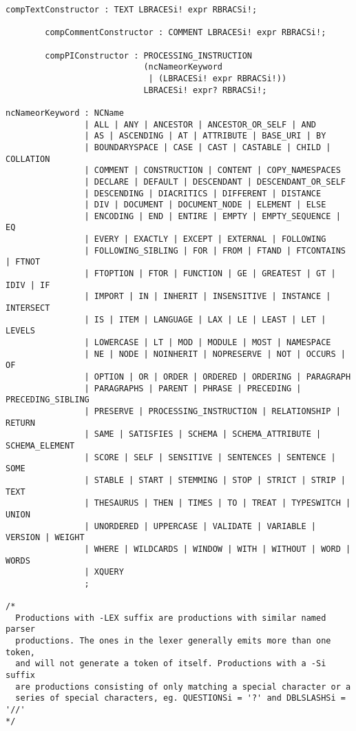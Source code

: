 \begin{Verbatim}[frame=none, fontsize=\footnotesize]
        compTextConstructor : TEXT LBRACESi! expr RBRACSi!;
        
        compCommentConstructor : COMMENT LBRACESi! expr RBRACSi!;
        
        compPIConstructor : PROCESSING_INSTRUCTION 
                            (ncNameorKeyword 
                             | (LBRACESi! expr RBRACSi!)) 
                            LBRACESi! expr? RBRACSi!;

ncNameorKeyword : NCName
                | ALL | ANY | ANCESTOR | ANCESTOR_OR_SELF | AND
                | AS | ASCENDING | AT | ATTRIBUTE | BASE_URI | BY
                | BOUNDARYSPACE | CASE | CAST | CASTABLE | CHILD | COLLATION
                | COMMENT | CONSTRUCTION | CONTENT | COPY_NAMESPACES
                | DECLARE | DEFAULT | DESCENDANT | DESCENDANT_OR_SELF
                | DESCENDING | DIACRITICS | DIFFERENT | DISTANCE
                | DIV | DOCUMENT | DOCUMENT_NODE | ELEMENT | ELSE
                | ENCODING | END | ENTIRE | EMPTY | EMPTY_SEQUENCE | EQ
                | EVERY | EXACTLY | EXCEPT | EXTERNAL | FOLLOWING
                | FOLLOWING_SIBLING | FOR | FROM | FTAND | FTCONTAINS | FTNOT
                | FTOPTION | FTOR | FUNCTION | GE | GREATEST | GT | IDIV | IF
                | IMPORT | IN | INHERIT | INSENSITIVE | INSTANCE | INTERSECT
                | IS | ITEM | LANGUAGE | LAX | LE | LEAST | LET | LEVELS
                | LOWERCASE | LT | MOD | MODULE | MOST | NAMESPACE
                | NE | NODE | NOINHERIT | NOPRESERVE | NOT | OCCURS | OF
                | OPTION | OR | ORDER | ORDERED | ORDERING | PARAGRAPH
                | PARAGRAPHS | PARENT | PHRASE | PRECEDING | PRECEDING_SIBLING
                | PRESERVE | PROCESSING_INSTRUCTION | RELATIONSHIP | RETURN
                | SAME | SATISFIES | SCHEMA | SCHEMA_ATTRIBUTE | SCHEMA_ELEMENT
                | SCORE | SELF | SENSITIVE | SENTENCES | SENTENCE | SOME
                | STABLE | START | STEMMING | STOP | STRICT | STRIP | TEXT
                | THESAURUS | THEN | TIMES | TO | TREAT | TYPESWITCH | UNION
                | UNORDERED | UPPERCASE | VALIDATE | VARIABLE | VERSION | WEIGHT
                | WHERE | WILDCARDS | WINDOW | WITH | WITHOUT | WORD | WORDS
                | XQUERY
                ;

/*
  Productions with -LEX suffix are productions with similar named parser 
  productions. The ones in the lexer generally emits more than one token, 
  and will not generate a token of itself. Productions with a -Si suffix 
  are productions consisting of only matching a special character or a 
  series of special characters, eg. QUESTIONSi = '?' and DBLSLASHSi = '//'
*/


\end{Verbatim}
